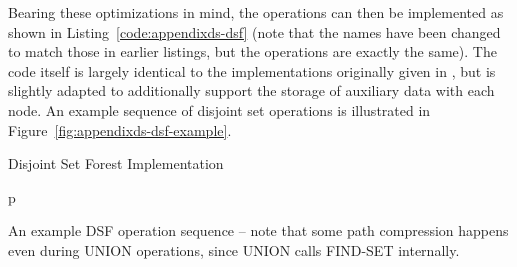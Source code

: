 \noindent Bearing these optimizations in mind, the operations can then be implemented as shown in Listing~\ref{code:appendixds-dsf} (note that the names have been changed to match those in earlier listings, but the operations are exactly the same). The code itself is largely identical to the implementations originally given in \cite{worrell06}, but is slightly adapted to additionally support the storage of auxiliary data with each node. An example sequence of disjoint set operations is illustrated in Figure~\ref{fig:appendixds-dsf-example}.

\begin{stulisting}[p]
\caption{Disjoint Set Forest Implementation}
\label{code:appendixds-dsf}

\end{stulisting}

\begin{stusubfig}{p}
	\hspace{4mm}%
	\hspace{4mm}%
	\hspace{4mm}%
\caption{An example DSF operation sequence -- note that some path compression happens even during UNION operations, since UNION calls FIND-SET internally.}
\label{fig:appendixds-dsf-example}
\end{stusubfig}

